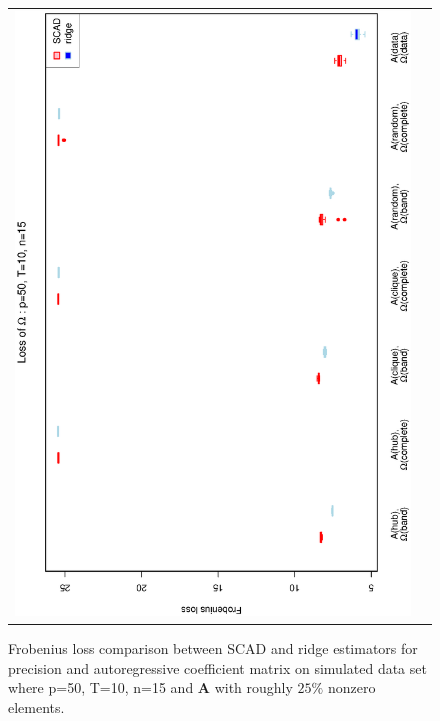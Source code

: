 \documentclass[a4paper]{article}
\begin{document}
\begin{figure}[h!]
\begin{tabular}{cc}
\includegraphics[scale=0.45,angle=270]{LossOmega50T10N15_25.eps}
\end{tabular}
\caption{Frobenius loss comparison between SCAD and ridge estimators for precision and autoregressive coefficient matrix on simulated data set where p=50, T=10, n=15 and $\mathbf{A}$ with roughly $25\%$ nonzero elements.}
\label{figSM:Loss50T10N15_25}
\end{figure}


\end{document}
